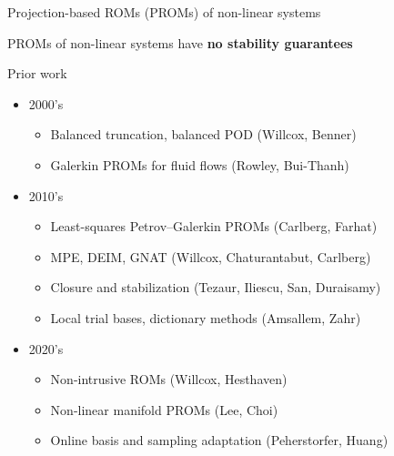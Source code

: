 \documentclass[]{beamer}
\begin{document}
\begin{frame}{Projection-based ROMs (PROMs) of non-linear systems}
\begin{minipage}{0.49\linewidth}
\begin{figure}
		\end{figure}
	\end{minipage}
	\begin{tcolorbox}[colframe=blue!50!white,halign=center]
		PROMs of non-linear systems have \textbf{no stability guarantees}
	\end{tcolorbox}
\end{frame}

\begin{frame}{Prior work}
	\begin{itemize}
		\item 2000's
		\begin{itemize}
			\item Balanced truncation, balanced POD (Willcox, Benner) 
			\item Galerkin PROMs for fluid flows (Rowley, Bui-Thanh)
		\end{itemize}
		\item 2010's
		\begin{itemize}
			\item Least-squares Petrov--Galerkin PROMs (Carlberg, Farhat)
			\item MPE, DEIM, GNAT (Willcox, Chaturantabut, Carlberg)
			\item Closure and stabilization (Tezaur, Iliescu, San, Duraisamy)
			\item Local trial bases, dictionary methods (Amsallem, Zahr)
		\end{itemize}
		\item 2020's
		\begin{itemize}
			\item Non-intrusive ROMs (Willcox, Hesthaven)
			\item Non-linear manifold PROMs (Lee, Choi)
			\item Online basis and sampling adaptation (Peherstorfer, Huang)
		\end{itemize}
		
	\end{itemize}
\end{frame}
\end{document}
